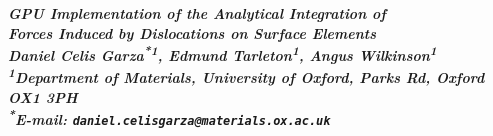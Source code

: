 

\begin{flushleft}
	\begin{minipage}{0.9\paperwidth}
		\centering
		{\fontsize{72}{86.4}\color{white}\selectfont\textbf{\emph{GPU Implementation of the Analytical Integration of\\ Forces Induced by Dislocations on Surface Elements}}}\\[0.8cm]
		{\fontsize{48}{57.6}\color{white}\selectfont\textbf{\emph{Daniel Celis Garza\textsuperscript{*1}, Edmund Tarleton\textsuperscript{1}, Angus Wilkinson\textsuperscript{1}}}}\\[0.6cm]
		{\fontsize{48}{57.6}\color{white}\selectfont\textbf{\emph{\textsuperscript{1}Department of Materials, University of Oxford, Parks Rd, Oxford OX1 3PH}}}\\[0.6cm]
		{\fontsize{48}{57.6}\color{white}\selectfont\textbf{\emph{\textsuperscript{*}E-mail: \texttt{daniel.celisgarza@materials.ox.ac.uk}}}}
	\end{minipage}
\end{flushleft}
\vspace{5cm}
